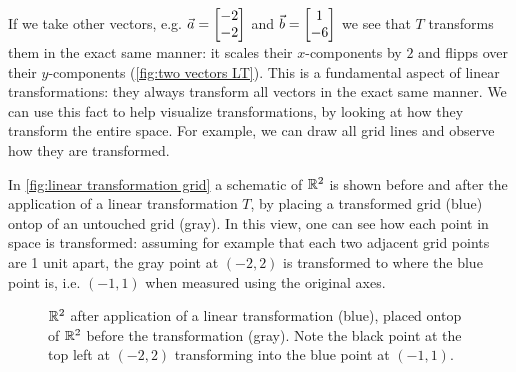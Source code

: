 If we take other vectors, e.g. $\vec{a}=\colvec{-2;-2}$ and $\vec{b}=\colvec{1;-6}$ we see that $T$ transforms them in the exact same manner: it scales their $x$-components by $2$ and flipps over their $y$-components (\autoref{fig:two vectors LT}). This is a fundamental aspect of linear transformations: they always transform all vectors in the exact same manner. We can use this fact to help visualize transformations, by looking at how they transform the entire space. For example, we can draw all grid lines and observe how they are transformed.

In \autoref{fig:linear transformation grid} a schematic of $\mathbb{R}^{2}$ is shown before and after the application of a linear transformation $T$, by placing a transformed grid (blue) ontop of an untouched grid (gray). In this view, one can see how each point in space is transformed: assuming for example that each two adjacent grid points are 1 unit apart, the gray point at $(-2,2)$ is transformed to where the blue point is, i.e. $(-1,1)$ when measured using the original axes. 


\begin{figure}
	\centering
	\caption{$\mathbb{R}^{2}$ after application of a linear transformation (blue), placed ontop of $\mathbb{R}^{2}$ before the transformation (gray). Note the black point at the top left at $(-2,2)$ transforming into the blue point at $(-1,1)$.}
	\label{fig:linear transformation grid}
\end{figure}

